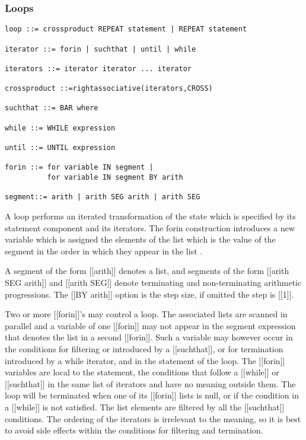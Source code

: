 \documentclass{article}
\begin{document}
\subsubsection{Loops}
\label{sec:boot:iteration}

\begin{verbatim}
loop ::= crossproduct REPEAT statement | REPEAT statement

iterator ::= forin | suchthat | until | while

iterators ::= iterator iterator ... iterator

crossproduct ::=rightassociative(iterators,CROSS)

suchthat ::= BAR where

while ::= WHILE expression

until ::= UNTIL expression

forin ::= for variable IN segment |
          for variable IN segment BY arith

segment::= arith | arith SEG arith | arith SEG
\end{verbatim}

A loop performs an iterated transformation of the state which is
specified by its statement component and its iterators.
The forin construction introduces a new variable which is assigned
the elements of the list which is the value of the segment in the order
in which they appear in the list .

A segment of the form [[arith]] denotes a list,
and segments of the form [[arith SEG arith]] and
[[arith SEG]] denote terminating and non-terminating
arithmetic progressions.
The [[BY arith]] option is the step size, if omitted the step is [[1]].

Two or more [[forin]]'s may control a loop.
The associated lists are scanned in parallel and
a variable of one [[forin]] may not appear in the segment expression that
denotes the list in a second [[forin]].
Such a variable may however occur in the conditions for filtering or
introduced by a [[suchthat]], or for termination introduced by a
while iterator, and in the statement of the loop.
The [[forin]] variables are local to the statement, the conditions
that follow a [[while]] or [[suchthat]] in the same list of iterators and
have no meaning outside them.
The loop will be terminated when one of its [[forin]] lists is null, or
if the condition in a [[while]] is not satisfied. The list
elements are filtered by all the [[suchthat]] conditions.
The ordering of the iterators is irrelevant to the meaning, so it is
best to avoid side effects within the conditions for filtering and
termination.
\end{document}

